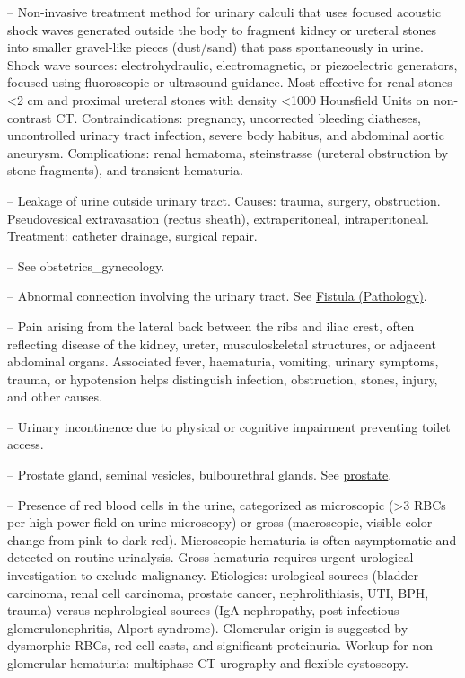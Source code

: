 -- Non-invasive treatment method for urinary calculi that uses focused acoustic shock waves generated outside the body to fragment kidney or ureteral stones into smaller gravel-like pieces (dust/sand) that pass spontaneously in urine. Shock wave sources: electrohydraulic, electromagnetic, or piezoelectric generators, focused using fluoroscopic or ultrasound guidance. Most effective for renal stones <2 cm and proximal ureteral stones with density <1000 Hounsfield Units on non-contrast CT. Contraindications: pregnancy, uncorrected bleeding diatheses, uncontrolled urinary tract infection, severe body habitus, and abdominal aortic aneurysm. Complications: renal hematoma, steinstrasse (ureteral obstruction by stone fragments), and transient hematuria.


-- Leakage of urine outside urinary tract. Causes: trauma, surgery, obstruction. Pseudovesical extravasation (rectus sheath), extraperitoneal, intraperitoneal. Treatment: catheter drainage, surgical repair.


-- See obstetrics\_gynecology.

-- Abnormal connection involving the urinary tract. See \hyperlink{Fistula (Pathology)}{Fistula (Pathology)}.

-- Pain arising from the lateral back between the ribs and iliac crest, often reflecting disease of the kidney, ureter, musculoskeletal structures, or adjacent abdominal organs. Associated fever, haematuria, vomiting, urinary symptoms, trauma, or hypotension helps distinguish infection, obstruction, stones, injury, and other causes.

-- Urinary incontinence due to physical or cognitive impairment preventing toilet access.

-- Prostate gland, seminal vesicles, bulbourethral glands. See \hyperlink{Prostate}{prostate}.

-- Presence of red blood cells in the urine, categorized as microscopic (>3 RBCs per high-power field on urine microscopy) or gross (macroscopic, visible color change from pink to dark red). Microscopic hematuria is often asymptomatic and detected on routine urinalysis. Gross hematuria requires urgent urological investigation to exclude malignancy. Etiologies: urological sources (bladder carcinoma, renal cell carcinoma, prostate cancer, nephrolithiasis, UTI, BPH, trauma) versus nephrological sources (IgA nephropathy, post-infectious glomerulonephritis, Alport syndrome). Glomerular origin is suggested by dysmorphic RBCs, red cell casts, and significant proteinuria. Workup for non-glomerular hematuria: multiphase CT urography and flexible cystoscopy.

